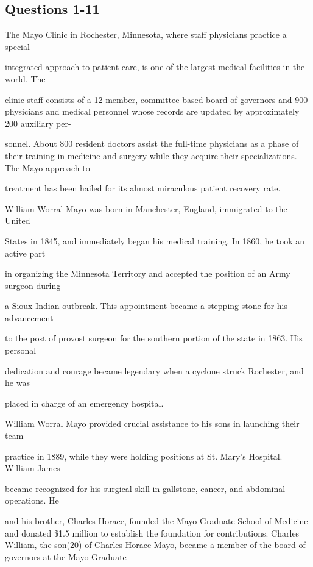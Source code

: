 \documentclass[12pt]{article}
\begin{document}
\subsection*{Questions 1-11}
\begingroup
\small
\sloppy
\setlength{\parskip}{0pt}
\setlength{\parindent}{0pt}
The Mayo Clinic in Rochester, Minnesota, where staff physicians practice a special\par
integrated approach to patient care, is one of the largest medical facilities in the world. The\par
clinic staff consists of a 12-member, committee-based board of governors and 900 physicians and medical personnel whose records are updated by approximately 200 auxiliary per-\par
sonnel. About 800 resident doctors assist the full-time physicians as a phase of their training in medicine and surgery while they acquire their specializations. The Mayo approach to\par
treatment has been hailed for its almost miraculous patient recovery rate.\par
William Worral Mayo was born in Manchester, England, immigrated to the United\par
States in 1845, and immediately began his medical training. In 1860, he took an active part\par
in organizing the Minnesota Territory and accepted the position of an Army surgeon during\par
a Sioux Indian outbreak. This appointment became a stepping stone for his advancement\par
to the post of provost surgeon for the southern portion of the state in 1863. His personal\par
dedication and courage became legendary when a cyclone struck Rochester, and he was\par
placed in charge of an emergency hospital.\par
William Worral Mayo provided crucial assistance to his sons in launching their team\par
practice in 1889, while they were holding positions at St. Mary's Hospital. William James\par
became recognized for his surgical skill in gallstone, cancer, and abdominal operations. He\par
and his brother, Charles Horace, founded the Mayo Graduate School of Medicine and donated \$1.5 million to establish the foundation for contributions. Charles William, the son(20) of Charles Horace Mayo, became a member of the board of governors at the Mayo Graduate\par
\end{document}

